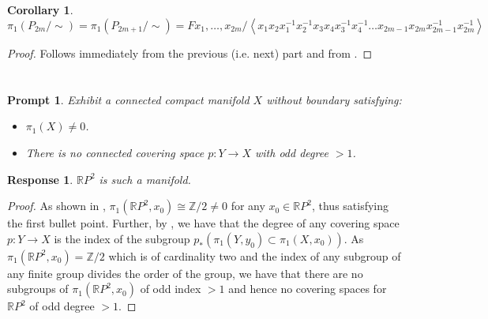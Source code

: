 \documentclass[english]{article}
\newcommand{\RR}{\mathbb{R}}
\newcommand{\ZZ}{\mathbb{Z}}
\newcommand{\prob}[1]{\setcounter{section}{#1-1}\section{}}
\newcommand{\prt}[1]{\setcounter{subsection}{#1-1}\subsection{}}
\newtheorem*{corollary*}{Corollary}
\newtheorem*{prompt*}{Prompt}
\newtheorem*{response*}{Response}
\theoremstyle{remark}
\theoremstyle{definition}
\newcommand{\idl}[1]{\left\langle #1 \right \rangle}
\newcommand{\RRP}{\RR P}
\begin{document}
\prt{1}\begin{corollary*}
	$\pi_1(P_{2m}/\sim)=\pi_1(P_{2m+1}/\sim)=F{x_1,\hdots,x_{2m}}/\idl{x_1x_2x_1^{-1}x_2^{-1}x_3x_4x_3^{-1}x_4^{-1}\dots x_{2m-1}x_{2m}x_{2m-1}^{-1}x_{2m}^{-1}}$
\end{corollary*}
\begin{proof}
	Follows immediately from the previous (i.e. next) part and from \cite[\S4.5.3]{ma}.
\end{proof}
\prob{5}
\begin{prompt*}
	Exhibit a connected compact manifold $X$ without boundary satisfying:\begin{itemize}
		\item $\pi_1(X)\neq 0$. \item There is no connected covering space $p:Y\to X$ with odd degree $>1$.
	\end{itemize}
\end{prompt*}
\begin{response*}
	$\RR P^2$ is such a manifold.
\end{response*}
\begin{proof}
	As shown in \cite[\S4.5.2]{ma}, $\pi_1(\RR P^2,x_0)\cong\ZZ/2\neq 0$ for any $x_0\in \RR P^2$, thus satisfying the first bullet point. Further, by \cite[Proposition 1.32]{at}, we have that the degree of any covering space $p:Y\to X$ is the index of the subgroup $p_*(\pi_1(Y,y_0)\subset \pi_1(X,x_0))$. As $\pi_1(\RR P^2,x_0)=\ZZ/2$ which is of cardinality two and the index of any subgroup of any finite group divides the order of the group, we have that there are no subgroups of $\pi_1(\RRP^2,x_0)$ of odd index $>1$ and hence no covering spaces for $\RRP^2 $ of odd degree $>1$.
\end{proof}
\printbibliography
\end{document}
